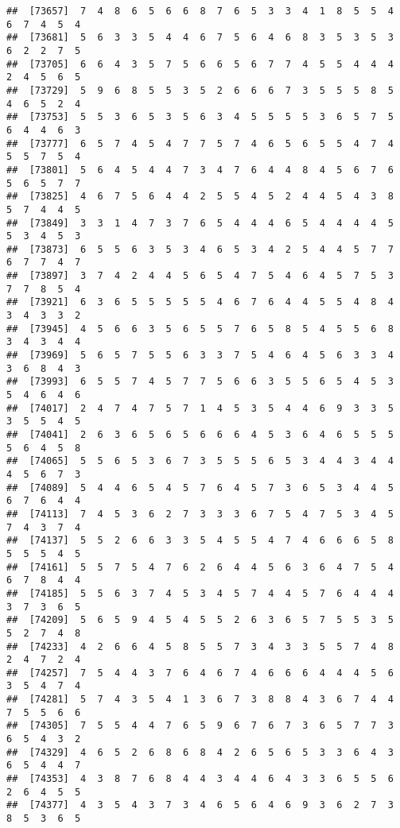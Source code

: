 \documentclass[
]{book}
\begin{document}
\begin{verbatim}
##  [73657]  7  4  8  6  5  6  6  8  7  6  5  3  3  4  1  8  5  5  4  6  7  4  5  4
##  [73681]  5  6  3  3  5  4  4  6  7  5  6  4  6  8  3  5  3  5  3  6  2  2  7  5
##  [73705]  6  6  4  3  5  7  5  6  6  5  6  7  7  4  5  5  4  4  4  2  4  5  6  5
##  [73729]  5  9  6  8  5  5  3  5  2  6  6  6  7  3  5  5  5  8  5  4  6  5  2  4
##  [73753]  5  5  3  6  5  3  5  6  3  4  5  5  5  5  3  6  5  7  5  6  4  4  6  3
##  [73777]  6  5  7  4  5  4  7  7  5  7  4  6  5  6  5  5  4  7  4  5  5  7  5  4
##  [73801]  5  6  4  5  4  4  7  3  4  7  6  4  4  8  4  5  6  7  6  5  6  5  7  7
##  [73825]  4  6  7  5  6  4  4  2  5  5  4  5  2  4  4  5  4  3  8  5  7  4  4  5
##  [73849]  3  3  1  4  7  3  7  6  5  4  4  4  6  5  4  4  4  4  5  5  3  4  5  3
##  [73873]  6  5  5  6  3  5  3  4  6  5  3  4  2  5  4  4  5  7  7  6  7  7  4  7
##  [73897]  3  7  4  2  4  4  5  6  5  4  7  5  4  6  4  5  7  5  3  7  7  8  5  4
##  [73921]  6  3  6  5  5  5  5  5  4  6  7  6  4  4  5  5  4  8  4  3  4  3  3  2
##  [73945]  4  5  6  6  3  5  6  5  5  7  6  5  8  5  4  5  5  6  8  3  4  3  4  4
##  [73969]  5  6  5  7  5  5  6  3  3  7  5  4  6  4  5  6  3  3  4  3  6  8  4  3
##  [73993]  6  5  5  7  4  5  7  7  5  6  6  3  5  5  6  5  4  5  3  5  4  6  4  6
##  [74017]  2  4  7  4  7  5  7  1  4  5  3  5  4  4  6  9  3  3  5  3  5  5  4  5
##  [74041]  2  6  3  6  5  6  5  6  6  6  4  5  3  6  4  6  5  5  5  5  6  4  5  8
##  [74065]  5  5  6  5  3  6  7  3  5  5  5  6  5  3  4  4  3  4  4  4  5  6  7  3
##  [74089]  5  4  4  6  5  4  5  7  6  4  5  7  3  6  5  3  4  4  5  6  7  6  4  4
##  [74113]  7  4  5  3  6  2  7  3  3  3  6  7  5  4  7  5  3  4  5  7  4  3  7  4
##  [74137]  5  5  2  6  6  3  3  5  4  5  5  4  7  4  6  6  6  5  8  5  5  5  4  5
##  [74161]  5  5  7  5  4  7  6  2  6  4  4  5  6  3  6  4  7  5  4  6  7  8  4  4
##  [74185]  5  5  6  3  7  4  5  3  4  5  7  4  4  5  7  6  4  4  4  3  7  3  6  5
##  [74209]  5  6  5  9  4  5  4  5  5  2  6  3  6  5  7  5  5  3  5  5  2  7  4  8
##  [74233]  4  2  6  6  4  5  8  5  5  7  3  4  3  3  5  5  7  4  8  2  4  7  2  4
##  [74257]  7  5  4  4  3  7  6  4  6  7  4  6  6  6  4  4  4  5  6  3  5  4  7  4
##  [74281]  5  7  4  3  5  4  1  3  6  7  3  8  8  4  3  6  7  4  4  7  5  5  6  6
##  [74305]  7  5  5  4  4  7  6  5  9  6  7  6  7  3  6  5  7  7  3  6  5  4  3  2
##  [74329]  4  6  5  2  6  8  6  8  4  2  6  5  6  5  3  3  6  4  3  6  5  4  4  7
##  [74353]  4  3  8  7  6  8  4  4  3  4  4  6  4  3  3  6  5  5  6  2  6  4  5  5
##  [74377]  4  3  5  4  3  7  3  4  6  5  6  4  6  9  3  6  2  7  3  8  5  3  6  5

\end{verbatim}
\end{document}
